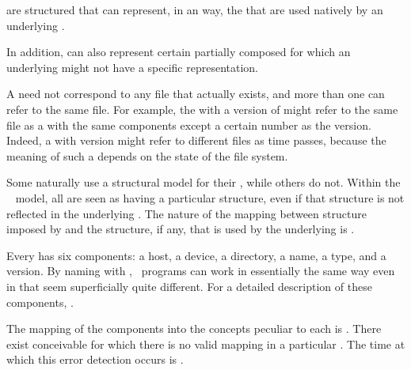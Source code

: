  are structured  that can represent,
in an  way, the  
that are used natively by an underlying .

In addition,  can also represent certain partially composed 
 for which an underlying  
might not have a specific  representation.


A  need not correspond to any file that actually exists, 
and more than one  can refer to the same file.
For example, the  with a version of  
might refer to the same file as a  
with the same components except a certain number as the version.
Indeed, a  with version  might refer to
different files as time passes, because the meaning of such a 
depends on the state of the file system.  

Some  naturally use a structural model for their
, while others do not.  Within the \clisp\  model, 
all  are seen as having a particular structure,
even if that structure is not reflected in the underlying .
The nature of the mapping between structure imposed by 
and the structure, if any, that is used by the underlying 
is .


Every  has six components:
     a host,
     a device,
     a directory,
     a name,
     a type,
 and a version.
By naming  with , 
\clisp\ programs can work in essentially the same way even in 
that seem superficially quite different.
For a detailed description of these components, \seesection\PathnameComponents.

The mapping of the  components into the concepts peculiar to 
each  is .
%
There exist conceivable  for which there is no valid mapping 
in a particular . The time at which this error detection
occurs is .

